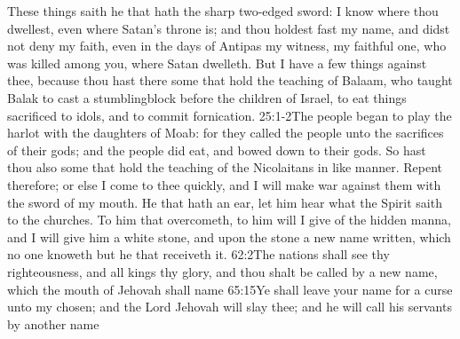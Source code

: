 These things saith he that hath the sharp two-edged sword:%
I know where thou dwellest,%
 even where Satan’s throne is; and thou holdest fast my name, and didst not deny my faith, even in the days of Antipas my witness, my faithful one, who was killed among you, where Satan dwelleth. %
But I have a few things against thee, because thou hast there some that hold the teaching of Balaam, who taught Balak to cast a stumblingblock before the children of Israel, to eat things sacrificed to idols, and to commit fornication.%
								{25:1-2}{The people began to play the harlot with the daughters of Moab: for they called the people unto the sacrifices of their gods; and the people did eat, and bowed down to their gods.}
So hast thou also some that hold the teaching of the Nicolaitans in like manner. %
Repent therefore; or else I come to thee quickly, and I will make war against them with the sword of my mouth.%
He that hath an ear, let him hear what the Spirit saith to the churches. To him that overcometh, to him will I give of the hidden manna,%
and I will give him a white stone, and upon the stone a new name written, which no one knoweth but he that receiveth it.
					{62:2}{The nations shall see thy righteousness, and all kings thy glory, and thou shalt be called by a new name, which the mouth of Jehovah shall name}
					{65:15}{Ye shall leave your name for a curse unto my chosen; and the Lord Jehovah will slay thee; and he will call his servants by another name}
